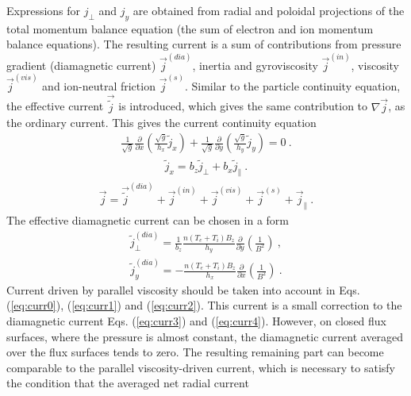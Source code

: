 \documentclass[a4paper,10pt]{report}
\begin{document}
Expressions for $j_{\perp}$ and $j_y$ are obtained from radial and
poloidal projections of the total momentum balance equation (the sum
of electron and ion momentum balance equations).
The resulting current is a sum of contributions from pressure
gradient (diamagnetic current) $\vec{j}^{\left( dia \right)}$, inertia
and gyroviscosity $\vec{j}^{\left( in \right)}$, viscosity
$\vec{j}^{\left( vis \right)}$ and ion-neutral friction
$\vec{j}^{\left( s \right)}$.
Similar to the particle continuity equation, the effective
current $\vec{\tilde{j}}$ is introduced, which gives the same contribution to
$\nabla \vec{j}$, as the ordinary current. This gives the current continuity
equation
\begin{gather}\label{eq:curr0}
     \frac{1}{\sqrt{g}} \frac{\partial }{\partial x}
      \left(\frac{\sqrt{g}}{h_x} \tilde{j}_x\right)+
     \frac{1}{\sqrt{g}} \frac{\partial }{\partial y}
      \left(\frac{\sqrt{g}}{h_y} \tilde{j}_y\right)
= 0~.
\end{gather}
\begin{gather}\label{eq:curr1}
\tilde{j}_x = b_z \tilde{j}_{\perp} + b_x \tilde{j}_{\parallel}~.
\end{gather}
\begin{gather}\label{eq:curr2}
\vec{j} = \vec{\tilde{j}}^{\left( dia \right)} + \vec{j}^{\left( in \right)}
+ \vec{j}^{\left( vis \right)} + \vec{j}^{\left( s \right)}
+\vec{j}_{\parallel}~.
\end{gather}
The effective diamagnetic current can be chosen in a form
\begin{gather}\label{eq:curr3}
\tilde{j}_{\perp}^{\left( dia \right)} =
\frac{1}{b_z}\frac{n\left( T_e + T_i \right) B_z}{h_y}
\frac{\partial}{\partial y}\left(\frac{1}{B^2}\right)~,
\end{gather}
\begin{gather}\label{eq:curr4}
\tilde{j}_y^{\left( dia \right)} =
- \frac{n\left( T_e + T_i \right) B_z}{h_x}
\frac{\partial}{\partial x}\left(\frac{1}{B^2}\right)~.
\end{gather}
Current driven by parallel viscosity should be taken into account in
Eqs. (\ref{eq:curr0}), (\ref{eq:curr1}) and (\ref{eq:curr2}).
This current is a small correction to the diamagnetic current
Eqs. (\ref{eq:curr3}) and (\ref{eq:curr4}).
However, on closed flux surfaces, where the pressure is almost constant,
the diamagnetic current averaged
over the flux surfaces tends to zero. The resulting remaining part can
become comparable to the parallel viscosity-driven current, which is
necessary to satisfy the condition that the averaged net radial current
\end{document}
